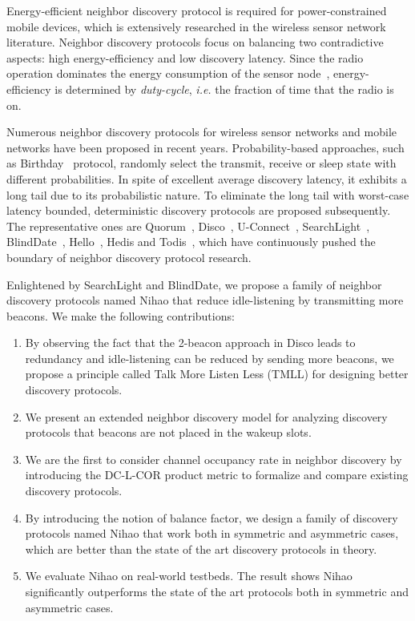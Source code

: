\documentclass[conference]{IEEEtran}
\begin{document}
Energy-efficient neighbor discovery protocol is required for power-constrained mobile devices,
which is extensively researched in the wireless sensor network literature.
Neighbor discovery protocols focus on balancing two contradictive aspects: high energy-efficiency and low discovery latency.
Since the radio operation dominates the energy consumption of the sensor node~\cite{dutta07procrastination},
energy-efficiency is determined by \emph{duty-cycle}, \emph{i.e.} the fraction of time that the radio is on.

Numerous neighbor discovery protocols for wireless sensor networks and mobile networks have been proposed in recent years.
Probability-based approaches, such as Birthday~\cite{mcglynn2001birthday} protocol, randomly select the transmit, receive or sleep state with different probabilities.
In spite of excellent average discovery latency, it exhibits a long tail due to its probabilistic nature. 
To eliminate the long tail with worst-case latency bounded, deterministic discovery protocols are proposed subsequently.
The representative ones are Quorum~\cite{tseng2003power}, Disco~\cite{dutta2008practical}, U-Connect~\cite{kandhalu2010u},
SearchLight~\cite{bakht2012mobicom}, BlindDate~\cite{wang2015blinddate}, Hello~\cite{sun2014hello}, Hedis and Todis~\cite{chen2015infocom},
which have continuously pushed the boundary of neighbor discovery protocol research.

Enlightened by SearchLight and BlindDate, we propose a family of neighbor discovery protocols named Nihao that reduce idle-listening by transmitting more beacons.
We make the following contributions:
\begin{enumerate}
    \item By observing the fact that the 2-beacon approach in Disco leads to redundancy and idle-listening can be reduced by sending more beacons, we propose a principle called Talk More Listen Less (TMLL) for designing better discovery protocols.
    \item We present an extended neighbor discovery model for analyzing discovery protocols that beacons are not placed in the wakeup slots.
    \item We are the first to consider channel occupancy rate in neighbor discovery by introducing the DC-L-COR product metric to formalize and compare existing discovery protocols.
    \item By introducing the notion of balance factor, we design a family of discovery protocols named Nihao that work both in symmetric and asymmetric cases, which are better than the state of the art discovery protocols in theory.
    \item We evaluate Nihao on real-world testbeds. The result shows Nihao significantly outperforms the state of the art protocols both in symmetric and asymmetric cases.
\end{enumerate}
\end{document}
